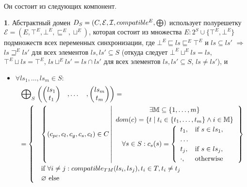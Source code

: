 Он состоит из следующих компонент.

{\textbf 1.} Абстрактный домен $D_{S}=(C, \mathcal{E}, \mathcal{I},compatible^E, \mathrel{\bigoplus})$ использует полурешетку
$\mathcal{E}=(E, \top^E, \bot^E, \sqsubseteq^E, \sqcup^E)$, которая состоит из множества 
$E: 2^S \cup \{\top^E, \bot^E\}$ подмножеств всех переменных синхронизации, 
где 
$\bot^E \sqsubseteq ls \sqsubseteq^E \top^E$ и $ls \subseteq ls'$ $\Rightarrow$ $ls \sqsupseteq^E ls'$ для всех элементов $ls, ls' \subseteq S$ 
(откуда следует $\bot^E \sqcup^E ls = ls$, $\top^E \sqcup ls=\top^E$, $ ls\sqcup^E ls' = ls \cap ls'$ для всех элементов $ls,ls'\subseteq S$, $ls\neq ls'$), 
и 
\begin{itemize}
\item $\forall ls_1, \dots, ls_m \in S:$
\begin{equation}
\begin{aligned}
& \mathrel{\bigoplus}_S \begin{pmatrix}
\begin{pmatrix}
ls_1 \\
t_1 
\end{pmatrix}& ,
\dots& ,
\begin{pmatrix}
ls_m \\
t_m 
\end{pmatrix}
\end{pmatrix} = \nonumber \\
& = \begin{cases}
& \left\lbrace (c_{pc},c_l,c_g,c_s,c_t) \in C 
\left| 
\begin{array}{c}
\exists \mathbb{M} \subseteq \{1, \dots,m\} \\
dom(c) = \{t \mid t_i \in \{t_1,\dots,t_m\} \land i \in \mathbb{M}\}\\
\forall s \in S:
c_s(s) = 
\left\lbrace
\begin{array}{ll}
t_1,&\mbox{if } s \in ls_1,\\
\dots\\
t_j,&\mbox{if } s \in ls_j,\\
\cdot,& \mbox{otherwise}\\
\end{array}
\right.\\
\end{array}
\right.
\right\rbrace\\
& \mbox{if } \forall i \neq j: compatible_{TM}(ls_i, ls_j), t_i \in T, t_i \neq t_j \\
& \varnothing \mbox{ else}
\end{cases}
\end{aligned}
\end{equation}


\end{itemize}
